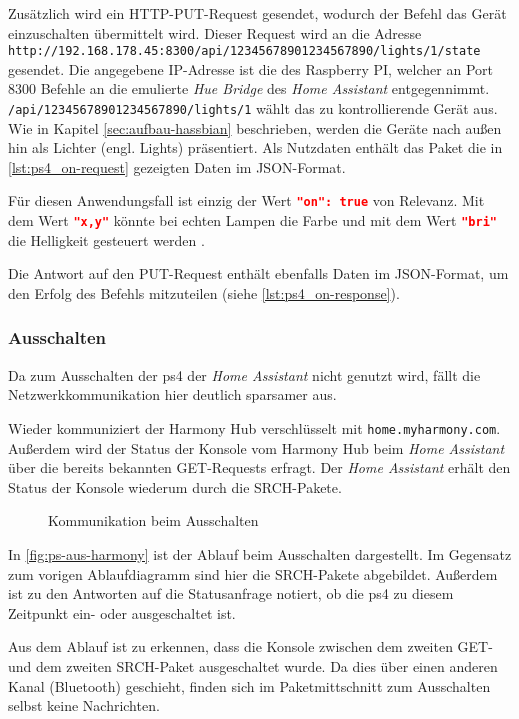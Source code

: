 Zusätzlich wird ein HTTP-PUT-Request gesendet, wodurch der Befehl das Gerät einzuschalten übermittelt wird.
Dieser Request wird an die Adresse \nolinkurl{http://192.168.178.45:8300/api/12345678901234567890/lights/1/state} gesendet.
Die angegebene IP-Adresse ist die des Raspberry PI, welcher an Port 8300 Befehle an die emulierte \textit{Hue Bridge} des \textit{Home Assistant} entgegennimmt.
\texttt{/api/12345678901234567890/lights/1} wählt das zu kontrollierende Gerät aus.
Wie in Kapitel \ref{sec:aufbau-hassbian} beschrieben, werden die Geräte nach außen hin als Lichter (engl. Lights) präsentiert.
Als Nutzdaten enthält das Paket die in \autoref{lst:ps4_on-request} gezeigten Daten im JSON-Format.



Für diesen Anwendungsfall ist einzig der Wert \lstinline[language=json]{"on": true} von Relevanz.
Mit dem Wert \lstinline[language=json]{"x,y"} könnte bei echten Lampen die Farbe
und mit dem Wert \lstinline[language=json]{"bri"} die Helligkeit gesteuert werden \cite{Coreconc26:online}.

\newpage

Die Antwort auf den PUT-Request enthält ebenfalls Daten im JSON-Format,
um den Erfolg des Befehls mitzuteilen (siehe \autoref{lst:ps4_on-response}).


\newpage
\subsubsection{Ausschalten}
Da zum Ausschalten der \ac{ps4} der \textit{Home Assistant} nicht genutzt wird,
fällt die Netzwerkkommunikation hier deutlich sparsamer aus.

Wieder kommuniziert der Harmony Hub verschlüsselt mit \nolinkurl{home.myharmony.com}.
Außerdem wird der Status der Konsole vom Harmony Hub beim \textit{Home Assistant} über die bereits bekannten GET-Requests erfragt.
Der \textit{Home Assistant} erhält den Status der Konsole wiederum durch die SRCH-Pakete.

\begin{figure}[ht!]
    \centering
    \resizebox{\textwidth}{!}{
        
    }
    \caption{Kommunikation beim Ausschalten}
    \label{fig:ps-aus-harmony}
\end{figure}

In \autoref{fig:ps-aus-harmony} ist der Ablauf beim Ausschalten dargestellt.
Im Gegensatz zum vorigen Ablaufdiagramm sind hier die SRCH-Pakete abgebildet.
Außerdem ist zu den Antworten auf die Statusanfrage notiert,
ob die \ac{ps4} zu diesem Zeitpunkt ein- oder ausgeschaltet ist.

Aus dem Ablauf ist zu erkennen,
dass die Konsole zwischen dem zweiten GET- und dem zweiten SRCH-Paket ausgeschaltet wurde.
Da dies über einen anderen Kanal (Bluetooth) geschieht,
finden sich im Paketmittschnitt zum Ausschalten selbst keine Nachrichten.